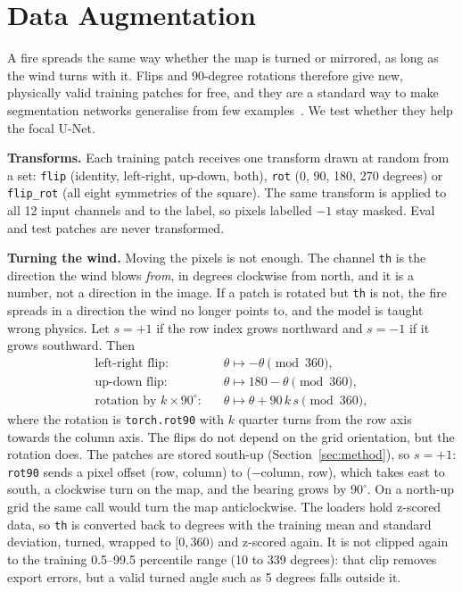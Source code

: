 
\section{Data Augmentation}
\label{sec:dl_aug}

A fire spreads the same way whether the map is turned or mirrored, as long as the wind turns with it. Flips
and 90-degree rotations therefore give new, physically valid training patches for free, and they are a
standard way to make segmentation networks generalise from few examples~\cite{ronneberger2015}. We test
whether they help the focal U-Net.

\textbf{Transforms.} Each training patch receives one transform drawn at random from a set: \texttt{flip}
(identity, left-right, up-down, both), \texttt{rot} (0, 90, 180, 270 degrees) or \texttt{flip\_rot} (all
eight symmetries of the square). The same transform is applied to all 12 input channels and to the label,
so pixels labelled $-1$ stay masked. Eval and test patches are never transformed.

\textbf{Turning the wind.} Moving the pixels is not enough. The channel \texttt{th} is the direction the
wind blows \emph{from}, in degrees clockwise from north, and it is a number, not a direction in the image. If a
patch is rotated but \texttt{th} is not, the fire spreads in a direction the wind no longer points to, and
the model is taught wrong physics. Let $s=+1$ if the row index grows northward and $s=-1$ if it grows
southward. Then
\begin{align}
\text{left-right flip:}\quad & \theta \mapsto -\theta \pmod{360}, \nonumber\\
\text{up-down flip:}\quad & \theta \mapsto 180 - \theta \pmod{360}, \label{eq:aug_th}\\
\text{rotation by } k \times 90^\circ\text{:}\quad & \theta \mapsto \theta + 90\,k\,s \pmod{360}, \nonumber
\end{align}
where the rotation is \texttt{torch.rot90} with $k$ quarter turns from the row axis towards the column axis.
The flips do not depend on the grid orientation, but the rotation does. The patches are stored
south-up (Section~\ref{sec:method}), so $s=+1$: \texttt{rot90} sends a pixel offset (row, column) to
($-$column, row), which takes east to south, a clockwise turn on the map, and the bearing grows by
$90^\circ$. On a north-up grid the same call would turn the map anticlockwise. The loaders hold
z-scored data, so \texttt{th} is converted back to degrees with the training mean and standard deviation,
turned, wrapped to $[0, 360)$ and z-scored again. It is not clipped again to the training 0.5--99.5
percentile range (10 to 339 degrees): that clip removes export errors, but a valid turned angle such as
5 degrees falls outside it.

